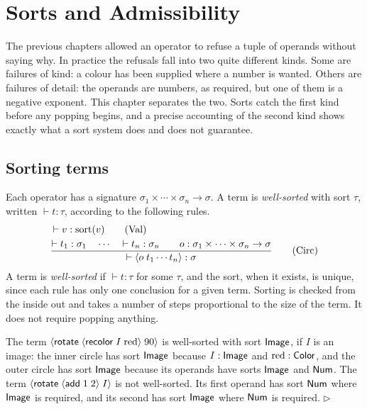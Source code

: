 \chapter{Sorts and Admissibility}
\label{ch:sorts}

The previous chapters allowed an operator to refuse a tuple of operands without saying why. In practice the refusals fall into two quite different kinds. Some are failures of kind: a colour has been supplied where a number is wanted. Others are failures of detail: the operands are numbers, as required, but one of them is a negative exponent. This chapter separates the two. Sorts catch the first kind before any popping begins, and a precise accounting of the second kind shows exactly what a sort system does and does not guarantee.

\section{Sorting terms}

Each operator has a signature $\sigma_1\times\cdots\times\sigma_n\to\sigma$. A term is \emph{well-sorted} with sort $\tau$, written $\vdash t:\tau$, according to the following rules.
\begin{align}
&\vdash v:\mathrm{sort}(v) \tag{Val}\\
&\frac{\vdash t_1:\sigma_1\quad\cdots\quad\vdash t_n:\sigma_n\qquad o:\sigma_1\times\cdots\times\sigma_n\to\sigma}{\vdash\langle o\; t_1\cdots t_n\rangle:\sigma} \tag{Circ}
\end{align}
A term is \emph{well-sorted} if $\vdash t:\tau$ for some $\tau$, and the sort, when it exists, is unique, since each rule has only one conclusion for a given term. Sorting is checked from the inside out and takes a number of steps proportional to the size of the term. It does not require popping anything.

\begin{example}
The term $\langle \mathsf{rotate}\; \langle \mathsf{recolor}\; I\; \mathrm{red}\rangle\; 90\rangle$ is well-sorted with sort $\mathsf{Image}$, if $I$ is an image: the inner circle has sort $\mathsf{Image}$ because $I:\mathsf{Image}$ and $\mathrm{red}:\mathsf{Color}$, and the outer circle has sort $\mathsf{Image}$ because its operands have sorts $\mathsf{Image}$ and $\mathsf{Num}$. The term $\langle \mathsf{rotate}\; \langle \mathsf{add}\; 1\; 2\rangle\; I\rangle$ is not well-sorted. Its first operand has sort $\mathsf{Num}$ where $\mathsf{Image}$ is required, and its second has sort $\mathsf{Image}$ where $\mathsf{Num}$ is required. \hfill$\triangleright$
\end{example}

